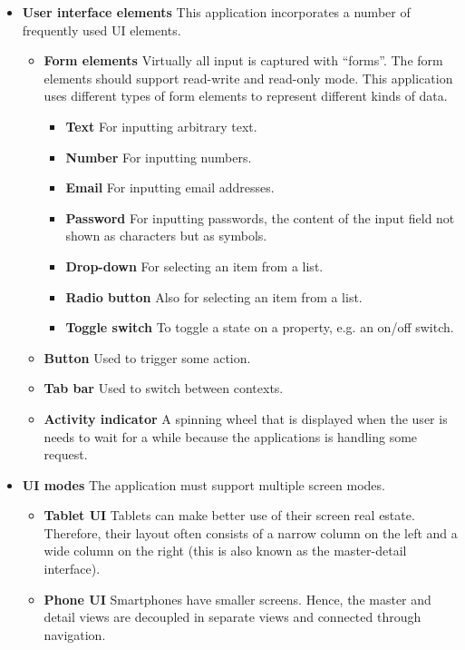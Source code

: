 \begin{itemize}
    \item \textbf{User interface elements} This application incorporates a number of frequently used UI elements.
    \begin{itemize}
        \item \textbf{Form elements} Virtually all input is captured with ``forms''. The form elements should support read-write and read-only mode. This application uses different types of form elements to represent different kinds of data. 
        \begin{itemize}
            \item \textbf{Text} For inputting arbitrary text.
            \item \textbf{Number} For inputting numbers.
            \item \textbf{Email} For inputting email addresses.
            \item \textbf{Password} For inputting passwords, the content of the input field not shown as characters but as symbols. 
            \item \textbf{Drop-down} For selecting an item from a list.
            \item \textbf{Radio button} Also for selecting an item from a list.
            \item \textbf{Toggle switch} To toggle a state on a property, e.g. an on/off switch.
        \end{itemize}
        \item \textbf{Button} Used to trigger some action.
        \item \textbf{Tab bar} Used to switch between contexts.
        \item \textbf{Activity indicator} A spinning wheel that is displayed when the user is needs to wait for a while because the applications is handling some request.
    \end{itemize}
    \item \textbf{UI modes} The application must support multiple screen modes.
    \begin{itemize}
        \item \textbf{Tablet UI} Tablets can make better use of their screen real estate. Therefore, their layout often consists of a narrow column on the left and a wide column on the right (this is also known as the master-detail interface).
        \item \textbf{Phone UI} Smartphones have smaller screens. Hence, the master and detail views are decoupled in separate views and connected through navigation.

\end{itemize}
\end{itemize}
